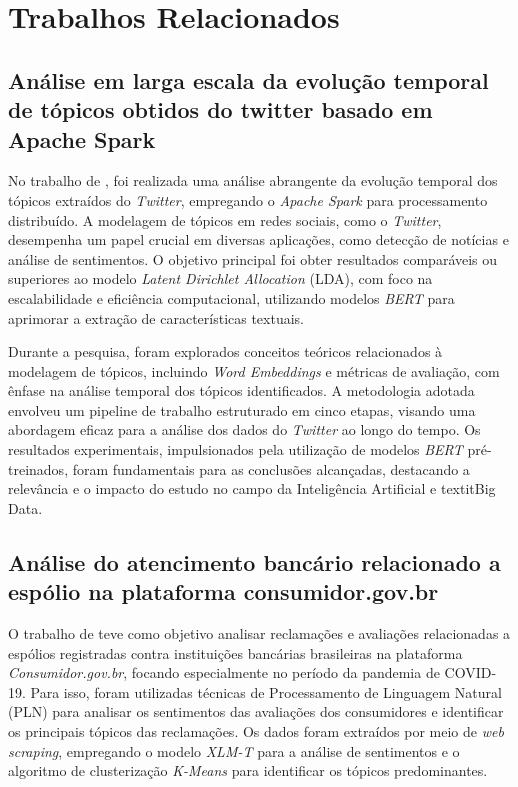 \chapter{Trabalhos Relacionados}
\label{cap:trabalhos_relacionados}


\section{Análise em larga escala da evolução temporal de tópicos obtidos do twitter basado em Apache Spark}
\label{cap:trabalhos_relacionados:sec:braulio}

No trabalho de , foi realizada uma análise abrangente da evolução temporal dos tópicos extraídos do \textit{Twitter}, empregando o \textit{Apache Spark} para processamento distribuído. A modelagem de tópicos em redes sociais, como o \textit{Twitter}, desempenha um papel crucial em diversas aplicações, como detecção de notícias e análise de sentimentos. O objetivo principal foi obter resultados comparáveis ou superiores ao modelo \textit{Latent Dirichlet Allocation} (LDA), com foco na escalabilidade e eficiência computacional, utilizando modelos \textit{BERT} para aprimorar a extração de características textuais.

Durante a pesquisa, foram explorados conceitos teóricos relacionados à modelagem de tópicos, incluindo \textit{Word Embeddings} e métricas de avaliação, com ênfase na análise temporal dos tópicos identificados. A metodologia adotada envolveu um pipeline de trabalho estruturado em cinco etapas, visando uma abordagem eficaz para a análise dos dados do \textit{Twitter} ao longo do tempo. Os resultados experimentais, impulsionados pela utilização de modelos \textit{BERT} pré-treinados, foram fundamentais para as conclusões alcançadas, destacando a relevância e o impacto do estudo no campo da Inteligência Artificial e textit{Big Data}.


\section{Análise do atencimento bancário relacionado a espólio na plataforma consumidor.gov.br}
\label{cap:trabalhos_relacionados:sec:desterro}

O trabalho de  teve como objetivo analisar reclamações e avaliações relacionadas a espólios registradas contra instituições bancárias brasileiras na plataforma \textit{Consumidor.gov.br}, focando especialmente no período da pandemia de COVID-19. Para isso, foram utilizadas técnicas de Processamento de Linguagem Natural (PLN) para analisar os sentimentos das avaliações dos consumidores e identificar os principais tópicos das reclamações. Os dados foram extraídos por meio de \textit{web scraping}, empregando o modelo \textit{XLM-T} para a análise de sentimentos e o algoritmo de clusterização \textit{K-Means} para identificar os tópicos predominantes.

